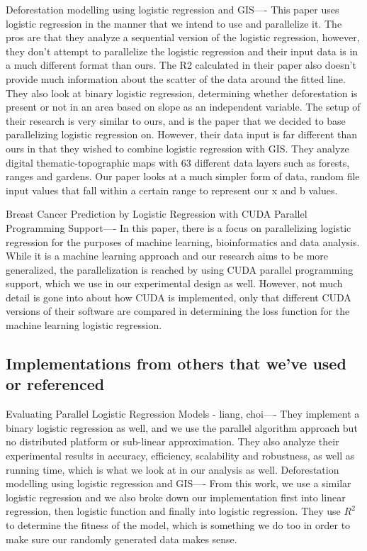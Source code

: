 \documentclass[letterpaper, 10 pt, conference]{ieeeconf}  %
\begin{document}
Deforestation modelling using logistic regression and GIS----
This paper uses logistic regression in the manner that we intend to use and parallelize it. The pros are that they analyze a sequential version of the logistic regression, however, they don’t attempt to parallelize the logistic regression and their input data is in a much different format than ours. The R2 calculated in their paper also doesn’t provide much information about the scatter of the data around the fitted line. They also look at binary logistic regression, determining whether deforestation is present or not in an area based on slope as an independent variable. The setup of their research is very similar to ours, and is the paper that we decided to base parallelizing logistic regression on. However, their data input is far different than ours in that they wished to combine logistic regression with GIS. They analyze digital thematic-topographic maps with 63 different data layers such as forests, ranges and gardens. Our paper looks at a much simpler form of data, random file input values that fall within a certain range to represent our x and b values.

Breast Cancer Prediction by Logistic Regression with CUDA Parallel Programming Support---- 
In this paper, there is a focus on parallelizing logistic regression for the purposes of machine learning, bioinformatics and data analysis. While it is a machine learning approach and our research aims to be more generalized, the parallelization is reached by using CUDA parallel programming support, which we use in our experimental design as well. However, not much detail is gone into about how CUDA is implemented, only that different CUDA versions of their software are compared in determining the loss function for the machine learning logistic regression.

\subsection{Implementations from others that we’ve used or referenced} 
Evaluating Parallel Logistic Regression Models - liang, choi----
They implement a binary logistic regression as well, and we use the parallel algorithm approach but no distributed platform or sub-linear approximation. They also analyze their experimental results in accuracy, efficiency, scalability and robustness, as well as running time, which is what we look at in our analysis as well.  
Deforestation modelling using logistic regression and GIS----
From this work, we use a similar logistic regression and we also broke down our implementation first into linear regression, then logistic function and finally into logistic regression. They use $R^2$ to determine the fitness of the model, which is something we do too in order to make sure our randomly generated data makes sense. 
\end{document}
